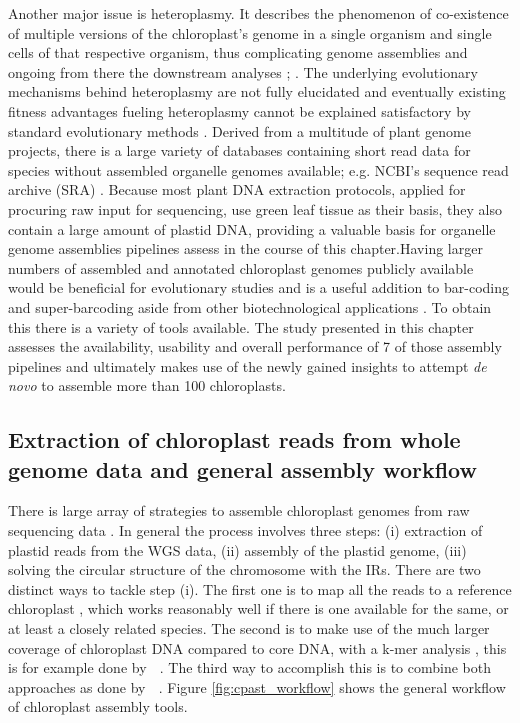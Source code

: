 Another major issue is heteroplasmy. It describes the phenomenon of co-existence of multiple versions of the
chloroplast's genome in a single organism and single cells of that respective organism, thus complicating
genome assemblies and ongoing from there the downstream analyses \cite{corriveau_1988}; \cite{Chat2002}. The
underlying evolutionary mechanisms behind heteroplasmy are not fully elucidated and eventually existing
fitness advantages fueling heteroplasmy cannot be explained satisfactory by standard evolutionary methods
\cite{Scar2016}. \newline Derived from a multitude of plant genome projects, there is a large variety of
databases containing short read data for species without assembled organelle genomes available; e.g. NCBI's
sequence read archive (SRA) \cite{SRA2010}. Because most plant DNA extraction protocols, applied for procuring
raw input for sequencing, use green leaf tissue as their basis, they also contain a large amount of plastid
DNA, providing a valuable basis for organelle genome assemblies pipelines assess in the course of this
chapter.\newline Having larger numbers of assembled and annotated chloroplast genomes publicly available would
be beneficial for evolutionary studies and is a useful addition to bar-coding and super-barcoding
\cite{coissac_barcodes_2016} aside from other biotechnological applications
\cite{daniell_chloroplast_2016}. To obtain this there is a variety of tools available. The study presented in
this chapter assesses the availability, usability and overall performance of 7 of those assembly pipelines and
ultimately makes use of the newly gained insights to attempt \textit{de novo} to assemble more than 100
chloroplasts.

\subsection{Extraction of chloroplast reads from whole genome data and general assembly workflow}
There is large array of strategies to assemble chloroplast genomes from raw sequencing data
\cite{twyford_strategies_2017}. In general the process involves three steps: (i) extraction of plastid reads
from the WGS data, (ii) assembly of the plastid genome, (iii) solving the circular structure of the chromosome
with the IRs. There are two distinct ways to tackle step (i). The first one is to map all the reads to a
reference chloroplast \cite{Vinga2012}, which works reasonably well if there is one available for the same, or
at least a closely related species. The second is to make use of the much larger coverage of chloroplast DNA
compared to core DNA, with a k-mer analysis \cite{Chan2013}, this is for example done by \ce $\;$
\cite{j_ankenbrand_chloroextractor:_2018}.  The third way to accomplish this is to combine both approaches as
done by \np $\;$ \cite{dierckxsens_novoplasty:_2017}.  Figure \ref{fig:cpast_workflow} shows the general
workflow of chloroplast assembly tools.

